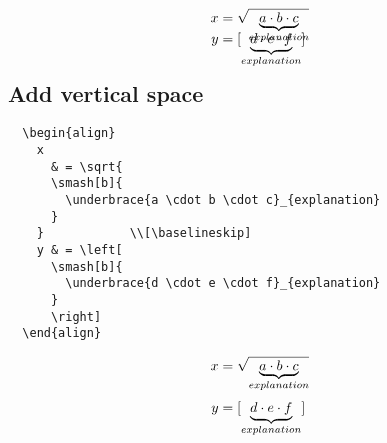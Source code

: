 \documentclass[../../latex]{subfiles}
\begin{document}
\begin{align}
  x
    & = \sqrt{
    \smash[b]{
      \underbrace{a \cdot b \cdot c}_{explanation}
    }
  }            \\
  y & = \left[
    \smash[b]{
      \underbrace{d \cdot e \cdot f}_{explanation}
    }
    \right]
\end{align}

\subsection{Add vertical space}

\begin{verbatim}
  \begin{align}
    x
      & = \sqrt{
      \smash[b]{
        \underbrace{a \cdot b \cdot c}_{explanation}
      }
    }            \\[\baselineskip]
    y & = \left[
      \smash[b]{
        \underbrace{d \cdot e \cdot f}_{explanation}
      }
      \right]
  \end{align}
\end{verbatim}

\begin{align}
  x
    & = \sqrt{
    \smash[b]{
      \underbrace{a \cdot b \cdot c}_{explanation}
    }
  }            \\[\baselineskip]
  y & = \left[
    \smash[b]{
      \underbrace{d \cdot e \cdot f}_{explanation}
    }
    \right]
\end{align}
\end{document}
